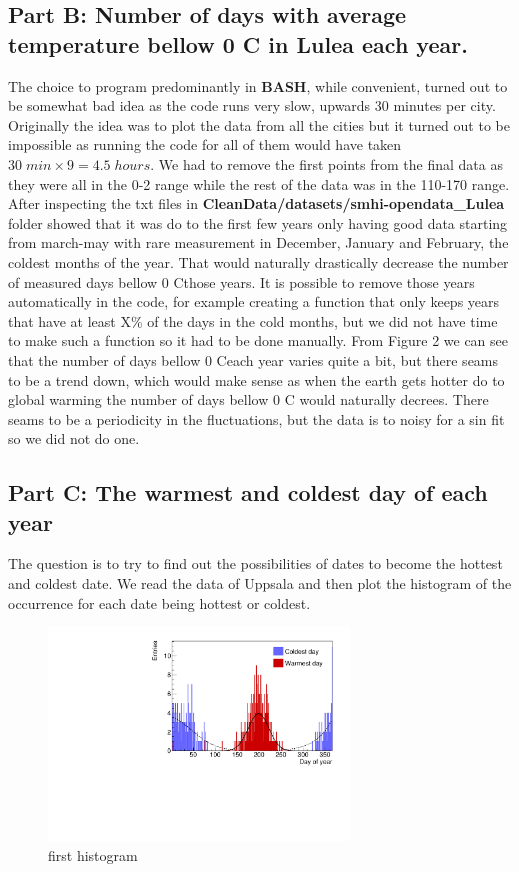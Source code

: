 \documentclass[a4paper]{article}
\begin{document}
\subsection{Part B: Number of days with average temperature bellow 0 C \degree in Lulea each
year.}
The choice to program predominantly in \textbf{BASH}, while convenient, turned out to be somewhat bad idea as the code runs very slow, upwards 30 minutes per city. Originally the idea was to plot the data from all the cities but it turned out to be impossible as running the code for all of them would have taken $30\; min \times 9=4.5\; hours$.
\newline
\newline
We had to remove the first points from the final data as they were all in the 0-2 range while the rest of the data was in the 110-170 range. After inspecting the txt files in \textbf{CleanData/datasets/smhi-opendata\_Lulea} folder showed that it was do to the first few years only having good data starting from march-may with rare measurement in December, January and February, the coldest months of the year. That would naturally drastically decrease the number of measured days bellow 0 C\degree those years. It is possible to remove those years automatically in the code, for example creating a function that only keeps years that have at least X\% of the days in the cold months, but we did not have time to make such a function so it had to be done manually.
\newline
\newline{}
From Figure 2 we can see that the number of days bellow 0 C\degree each year varies quite a bit, but there seams to be a trend down, which would make sense as when the earth gets hotter do to global warming the number of days bellow 0 C \degree would naturally decrees. There seams to be a periodicity in the fluctuations, but the data is to noisy for a sin fit so we did not do one.
\subsection{Part C: The warmest and coldest day of each year}

The question is to try to find out the possibilities of dates to become the hottest and coldest date. We read the data of Uppsala and then plot the histogram of the occurrence for each date being hottest or coldest. 

\begin{figure}[htp]
    \centering
    \includegraphics[width=8cm]{./images/hotCold_Upp_prev}
    \caption{first histogram}
    \label{fig:hist}
\end{figure}
\end{document}
